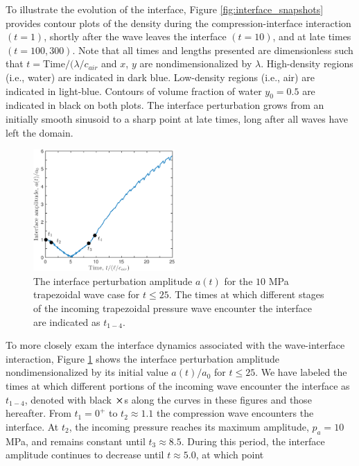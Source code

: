 % 
To illustrate the evolution of the interface, Figure
\ref{fig:interface_snapshots} provides contour plots of the density
during the compression-interface interaction $(t=1)$, shortly after
the wave leaves the interface $(t=10)$, and at late times
$(t=100, 300)$. Note that all times and lengths presented are
dimensionless such that $t = \text{Time}/(\lambda/c_{air}$ and $x$,
$y$ are nondimensionalized by $\lambda$. High-density regions (i.e.,
water) are indicated in dark blue. Low-density regions (i.e., air) are
indicated in light-blue. Contours of volume fraction of water
$y_0=0.5$ are indicated in black on both plots. The interface
perturbation grows from an initially smooth sinusoid to a sharp point
at late times, long after all waves have left the domain.
% 
\begin{figure}[h] 
  \centering
  \includegraphics[width=0.48\textwidth]{./figs/lung_figs/trapz10_intf_schematic}
  \caption[The interface perturbation amplitude for $t\leq25$]{The
    interface perturbation amplitude $a(t)$ for the $10$ MPa
    trapezoidal wave case for $t\leq25$. The times at which different
    stages of the incoming trapezoidal pressure wave encounter the
    interface are indicated as $t_{1-4}$.  }
  \label{fig:trapz10_interface}
\end{figure}\par
% 
To more closely exam the interface dynamics associated with the
wave-interface interaction, Figure \ref{fig:trapz10_interface} shows
the interface perturbation amplitude nondimensionalized by its initial
value $a(t)/a_0$ for $t\leq25$. We have labeled the times at which
different portions of the incoming wave encounter the interface as
$t_{1-4}$, denoted with black $\boldsymbol{\times}$s along the curves in these
figures and those hereafter. From $t_1=0^+$ to $t_2\approx1.1$ the
compression wave encounters the interface. At $t_2$, the incoming
pressure reaches its maximum amplitude, $p_a=10$ MPa, and remains
constant until $t_3\approx8.5$. During this period, the interface
amplitude continues to decrease until $t\approx 5.0$, at which point

